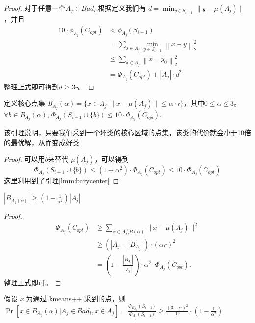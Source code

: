 \documentclass[lang=cn,newtx,10pt,scheme=chinese,chinesefont=nofont,citestyle=gb7714-2015, bibstyle=gb7714-2015]{elegantbook}
\begin{document}
\begin{refsection}
\begin{proof}
    对于任意一个$A_j\in Bad_i$,根据定义我们有 $d=\min _{y\in S_{i-1}} \|y-\mu(A_{j})\|$，并且
\begin{align*}
    10\cdot \phi_{A_j}(C_{opt})&<\phi_{A_j}(S_{i-1})\\
    &=\sum_{x\in A_j}\min_{y\in S_{i-1}}\left\lVert x-y\right\rVert_2^2\\
    &\leq \sum_{x\in A_j}\left\lVert x-y_0\right\rVert_2^2\\
    &=\Phi_{A_{j}}(C_{opt})+|A_{j}|\cdot d^{2}
\end{align*}
整理上式即可得到$d\ge 3r$。
\end{proof}




\begin{lemma}
    定义核心点集 $B_{A_{j}}(\alpha)=\{x\in A_{j}|\|x-\mu(A_{j})\|\le \alpha\cdot r\}$，其中$0\le \alpha\le 3$。$\forall b\in B_{A_{j}}(\alpha)$, $\Phi_{A_{j}}(S_{i-1}\cup \{b\}) \le 10\cdot \Phi_{A_{j}}(C_{opt}).$
\end{lemma}
该引理说明，只要我们采到一个坏类的核心区域的点集，该类的代价就会小于10倍的最优解，从而变成好类
\begin{proof}
    可以用$b$来替代 $\mu(A_{j})$，可以得到\[\Phi_{A_{j}}(S_{i-1}\cup \{b\})\le (1+\alpha^{2})\cdot\Phi_{A_{j}}(C_{opt})\le 10\cdot \Phi_{A_{j}}(C_{opt}) \]
    这里利用到了引理\ref{lmm:barycenter}
\end{proof}

\begin{lemma}
    $|B_{A_{j}(\alpha)}|\ge (1-\frac{1}{\alpha^{2}})|A_{j}|$
\end{lemma}

\begin{proof}
    \begin{align*}
        \Phi_{A_{j}}(C_{opt})& \ge \sum _{x\in A_{j}\setminus B(\alpha)}\|x-\mu(A_{j})\|^{2}\\
        &\ge(|A_{j}-|B_{A_{j}}|)\cdot(\alpha r)^{2}\\
        &= (1-\frac{|B_{A_{j}}|}{|A_{j}|})\cdot\alpha^{2}\cdot \Phi_{A_{j}}(C_{opt}).
    \end{align*} 
整理上式即可。
\end{proof}

\begin{lemma}
    假设 $x$ 为通过 kmeans++ 采到的点，则 $\Pr[x\in B_{A_{j}}(\alpha)|A_{j}\in Bad_{i},x\in A_{j}]=\frac{\Phi_{B_{A_{j}}}(S_{i-1})}{\Phi_{A_{j}}(S_{i-1})}\ge \frac{(3-\alpha)^2}{10}\cdot (1-\frac{1}{\alpha^{2}})$
    

\end{lemma}
\end{refsection}
\end{document}
